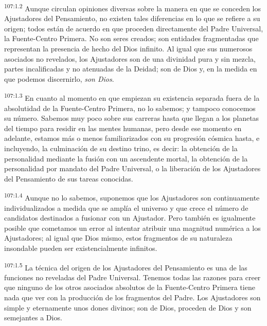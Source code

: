 \par
\textsuperscript{107:1.2} Aunque circulan opiniones diversas sobre la manera en que se conceden los Ajustadores del Pensamiento, no existen tales diferencias en lo que se refiere a su origen; todos están de acuerdo en que proceden directamente del Padre Universal, la Fuente-Centro Primera. No son seres creados; son entidades fragmentadas que representan la presencia de hecho del Dios infinito. Al igual que sus numerosos asociados no revelados, los Ajustadores son de una divinidad pura y sin mezcla, partes incalificadas y no atenuadas de la Deidad; son de Dios y, en la medida en que podemos discernirlo, \textit{son Dios}.

\par
\textsuperscript{107:1.3} En cuanto al momento en que empiezan su existencia separada fuera de la absolutidad de la Fuente-Centro Primera, no lo sabemos; y tampoco conocemos su número. Sabemos muy poco sobre sus carreras hasta que llegan a los planetas del tiempo para residir en las mentes humanas, pero desde ese momento en adelante, estamos más o menos familiarizados con su progresión cósmica hasta, e incluyendo, la culminación de su destino trino, es decir: la obtención de la personalidad mediante la fusión con un ascendente mortal, la obtención de la personalidad por mandato del Padre Universal, o la liberación de los Ajustadores del Pensamiento de sus tareas conocidas.

\par
\textsuperscript{107:1.4} Aunque no lo sabemos, suponemos que los Ajustadores son continuamente individualizados a medida que se amplía el universo y que crece el número de candidatos destinados a fusionar con un Ajustador. Pero también es igualmente posible que cometamos un error al intentar atribuir una magnitud numérica a los Ajustadores; al igual que Dios mismo, estos fragmentos de su naturaleza insondable pueden ser existencialmente infinitos.

\par
\textsuperscript{107:1.5} La técnica del origen de los Ajustadores del Pensamiento es una de las funciones no reveladas del Padre Universal. Tenemos todas las razones para creer que ninguno de los otros asociados absolutos de la Fuente-Centro Primera tiene nada que ver con la producción de los fragmentos del Padre. Los Ajustadores son simple y eternamente unos dones divinos; son de Dios, proceden de Dios y son semejantes a Dios.


